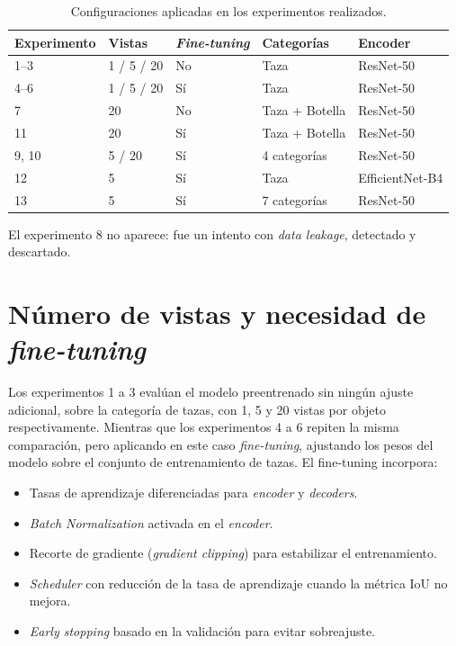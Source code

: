 \documentclass[10pt,a4paper]{report}
\begin{document}
\begin{table}[H]
  \centering
  \begin{threeparttable}
  \begin{tabular}{lllll}
    \toprule
    Experimento & Vistas & \textit{Fine-tuning} & Categorías & Encoder \\
    \midrule
    1--3   & 1 / 5 / 20 & No  & Taza                    & ResNet-50      \\
    4--6   & 1 / 5 / 20 & Sí  & Taza                    & ResNet-50      \\
    7 & 20        & No  & Taza + Botella          & ResNet-50      \\
    11  & 20        & Sí  & Taza + Botella          & ResNet-50      \\
    9, 10  & 5 / 20        & Sí  & 4 categorías            & ResNet-50      \\
    12     & 5        & Sí  & Taza                    & EfficientNet-B4 \\
    13     & 5          & Sí  & 7 categorías            & ResNet-50      \\
    \bottomrule
  \end{tabular}
  \begin{tablenotes}\footnotesize
    \item El experimento 8 no aparece: fue un intento con \textit{data leakage}, detectado y descartado.
  \end{tablenotes}
  \caption{Configuraciones aplicadas en los experimentos realizados.}
  \label{tab:config_experimentos}
  \end{threeparttable}
\end{table}



\section{Número de vistas y necesidad de \textit{fine-tuning}}
\label{sec:vistas_finetuning}

Los experimentos 1 a 3 evalúan el modelo preentrenado sin ningún ajuste adicional, sobre la categoría de tazas, con 1, 5 y 20 vistas por objeto respectivamente. Mientras que los experimentos 4 a 6 repiten la misma comparación, pero aplicando en este caso \textit{fine-tuning}, ajustando los pesos del modelo sobre el conjunto de entrenamiento de tazas.
El fine‑tuning incorpora:
\begin{itemize}
  \item Tasas de aprendizaje diferenciadas para \textit{encoder} y \textit{decoders}.
  \item \textit{Batch Normalization} activada en el \textit{encoder}.
  \item Recorte de gradiente (\textit{gradient clipping}) para estabilizar el entrenamiento.
  \item \textit{Scheduler} con reducción de la tasa de aprendizaje cuando la métrica IoU no mejora.
  \item \textit{Early stopping} basado en la validación para evitar sobreajuste.
\end{itemize}
\end{document}
